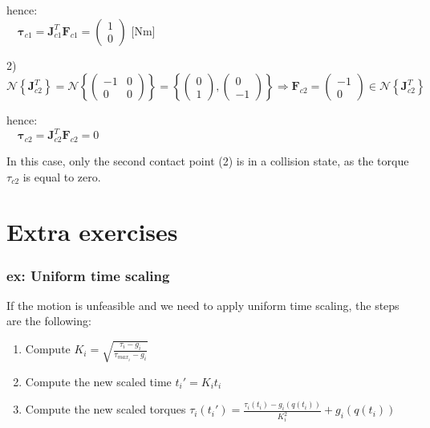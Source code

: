 \documentclass[a4paper,12pt]{article}
\begin{document}
\begin{center}
    hence:\\
    $\quad \boldsymbol{\tau}_{c1} = \boldsymbol{J}_{c1}^T \boldsymbol{F}_{c1} = \left(\begin{array}{c}
        1 \\
        0
        \end{array}\right) \text{ [Nm]}$
\end{center}

\begin{center}
    2) $\mathcal{N}\left\{\boldsymbol{J}_{c2}^T\right\} = \mathcal{N}\left\{\left(\begin{array}{cc}
        -1 & 0 \\
        0 & 0
        \end{array}\right)\right\} = \left\{\left(\begin{array}{cc} 0 \\ 1 \end{array}\right), \left(\begin{array}{cc} 0 \\ -1 \end{array}\right)\right\}
        \Rightarrow \boldsymbol{F}_{c2} = \left(\begin{array}{c}
        -1 \\
        0
        \end{array}\right) \in \mathcal{N}\left\{\boldsymbol{J}_{c2}^T\right\}$
    \end{center}
    
    \begin{center}
        hence:\\
        $\quad \boldsymbol{\tau}_{c2} = \boldsymbol{J}_{c2}^T \boldsymbol{F}_{c2} = 0$
    \end{center}

In this case, only the second contact point (2) is in a collision state, as the torque $\tau_{c2}$ is equal to zero.





\section{Extra exercises}
\subsubsection{ex: Uniform time scaling}
If the motion is unfeasible and we need to apply uniform time scaling, 
the steps are the following:
\begin{enumerate}
    \item Compute $K_i = \sqrt{\frac{\tau_i - g_i}{\tau_{max_i} - g_i}}$
    \item Compute the new scaled time $t_i' = K_i t_i$
    \item Compute the new scaled torques $\tau_i(t_i') = \frac{\tau_i(t_i) - g_i(q(t_i))}{K_i^2} + g_i(q(t_i))$
\end{enumerate}
\end{document}
